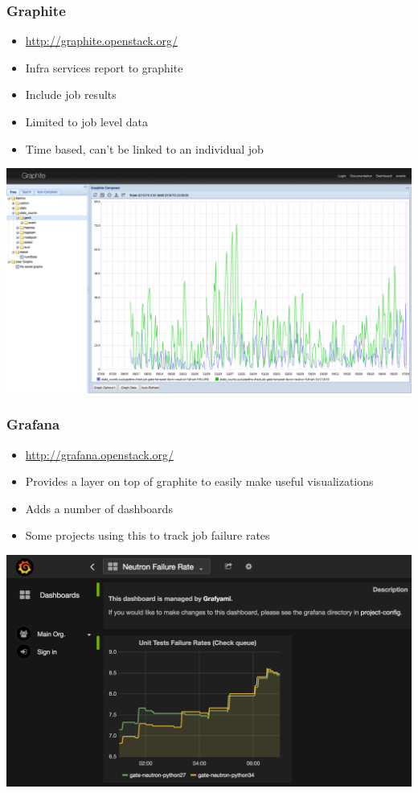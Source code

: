 \documentclass[aspectratio=43,11pt,hyperref={colorlinks=true}]{beamer}
\begin{document}
\begin{frame}
  \frametitle{Graphite}
  \begin{itemize}
    \item \href{http://graphite.openstack.org/}{http://graphite.openstack.org/}
    \item Infra services report to graphite
    \item Include job results
    \item Limited to job level data
    \item Time based, can't be linked to an individual job
  \end{itemize}
  \begin{center}
    \includegraphics[width=.65\textwidth]{graphite-sample.png}
  \end{center}
\end{frame}

\begin{frame}
  \frametitle{Grafana}
  \begin{itemize}
    \item \href{http://grafana.openstack.org/}{http://grafana.openstack.org/}
    \item Provides a layer on top of graphite to easily make useful visualizations
    \item Adds a number of dashboards
    \item Some projects using this to track job failure rates
  \end{itemize}
  \begin{center}
    \includegraphics[width=.7\textwidth]{grafana-sample.png}
  \end{center}
\end{frame}
\end{document}
